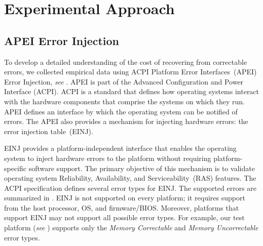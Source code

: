 
\section{Experimental Approach}
\label{sec:approach}

\subsection{APEI Error Injection}
\label{sec:approach:apei}
To develop a detailed understanding of the cost of recovering from correctable 
errors, we collected empirical data using ACPI Platform Error Interfaces~(APEI) Error 
Injection, \emph{see} .  APEI is part of the 
Advanced Configuration and Power Interface (ACPI).  ACPI is a standard that defines how 
operating systems interact with the hardware components that comprise the systems on 
which they run.  APEI defines an interface by which the operating system can be notified 
of errors.  The APEI also provides a mechanism for injecting hardware errors: the error 
injection table~(EINJ).



EINJ provides a platform-independent interface that enables the operating system to
inject hardware errors to the platform without requiring platform-specific software 
support. The primary objective of this mechanism is to validate operating system 
Reliability, Availability, and Serviceability~(RAS) features.  The ACPI specification 
defines several error types for EINJ.  The supported errors are summarized in .  
EINJ is not supported on every platform; it requires support from the host processor, 
OS, and firmware/BIOS.  Moreover, platforms that support EINJ may not support all 
possible error types.  For example, our test platform (\emph{see} )
supports only the \emph{Memory Correctable} and \emph{Memory Uncorrectable} error types.


